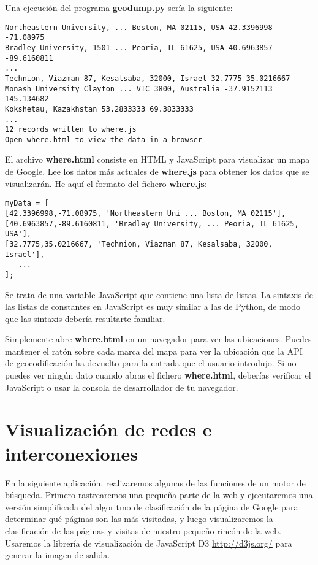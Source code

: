 Una ejecución del programa {\bf geodump.py} sería la siguiente: 

\beforeverb
\begin{verbatim}
Northeastern University, ... Boston, MA 02115, USA 42.3396998 -71.08975
Bradley University, 1501 ... Peoria, IL 61625, USA 40.6963857 -89.6160811
...
Technion, Viazman 87, Kesalsaba, 32000, Israel 32.7775 35.0216667
Monash University Clayton ... VIC 3800, Australia -37.9152113 145.134682
Kokshetau, Kazakhstan 53.2833333 69.3833333
...
12 records written to where.js
Open where.html to view the data in a browser
\end{verbatim}
\afterverb
%
El archivo {\bf where.html} consiste en HTML y JavaScript para visualizar
un mapa de Google. Lee los datos más actuales de {\bf where.js} para obtener
los datos que se visualizarán. He aquí el formato del fichero {\bf where.js}:

\beforeverb
\begin{verbatim}
myData = [
[42.3396998,-71.08975, 'Northeastern Uni ... Boston, MA 02115'],
[40.6963857,-89.6160811, 'Bradley University, ... Peoria, IL 61625, USA'],
[32.7775,35.0216667, 'Technion, Viazman 87, Kesalsaba, 32000, Israel'],
   ...
];
\end{verbatim}
\afterverb
%
Se trata de una variable JavaScript que contiene una lista de listas.
La sintaxis de las listas de constantes en JavaScript es muy similar a
las de Python, de modo que las sintaxis debería resultarte familiar.

Simplemente abre {\bf where.html} en un navegador para ver las ubicaciones.
Puedes mantener el ratón sobre cada marca del mapa para ver la
ubicación que la API de geocodificación ha devuelto para la entrada que el usuario introdujo.
Si no puedes ver ningún dato cuando abras el fichero {\bf where.html}, deberías
verificar el JavaScript o usar la consola de desarrollador de tu navegador.

\section{Visualización de redes e interconexiones}

En la siguiente aplicación, realizaremos algunas de las funciones de un motor
de búsqueda. Primero rastrearemos una pequeña parte de la web y ejecutaremos
una versión simplificada del algoritmo de clasificación de la página de Google
para determinar qué páginas son las más visitadas, y luego visualizaremos
la clasificación de las páginas y visitas de nuestro pequeño rincón de la web.
Usaremos la librería de visualización de JavaScript D3
\url{http://d3js.org/} para generar la imagen de salida.

